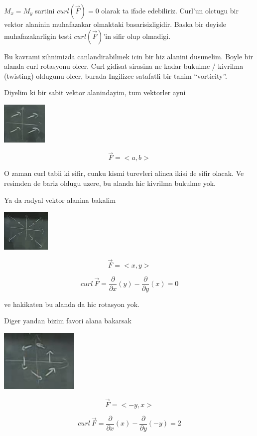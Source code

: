 \documentclass[12pt,fleqn]{article}
\begin{document}
$M_x = M_y$ sartini $curl(\vec{F}) = 0$ olarak ta ifade edebiliriz. Curl'un
olctugu bir vektor alaninin muhafazakar olmaktaki basarisizligidir. Baska
bir deyisle muhafazakarligin testi $curl(\vec{F})$'in sifir olup olmadigi. 

Bu kavrami zihnimizda canlandirabilmek icin bir hiz alanini
dusunelim. Boyle bir alanda curl rotasyonu olcer. Curl gidisat sirasina ne
kadar bukulme /  kivrilma (twisting) oldugunu olcer, burada Ingilizce satafatli bir
tanim ``vorticity''. 

Diyelim ki bir sabit vektor alanindayim, tum vektorler ayni

\includegraphics[height=2cm]{21_5.png}

\[ \vec{F} = <a,b> \]

O zaman curl tabii ki sifir, cunku kismi turevleri alinca ikisi de sifir
olacak. Ve resimden de bariz oldugu uzere, bu alanda hic kivrilma bukulme
yok. 

Ya da radyal vektor alanina bakalim

\includegraphics[height=2cm]{21_6.png}

\[ \vec{F}= <x,y> \]

\[ curl \ \vec{F} = \frac{\partial }{\partial x}(y) -
 \frac{\partial }{\partial y}(x) = 0
 \]

ve hakikaten bu alanda da hic rotasyon yok. 

Diger yandan bizim favori alana bakarsak

\includegraphics[height=3cm]{21_1.png}

\[ \vec{F} = <-y,x> \]

\[ curl \ \vec{F} = \frac{\partial }{\partial x}(x) -
 \frac{\partial }{\partial y}(-y) = 2
 \]
\end{document}
